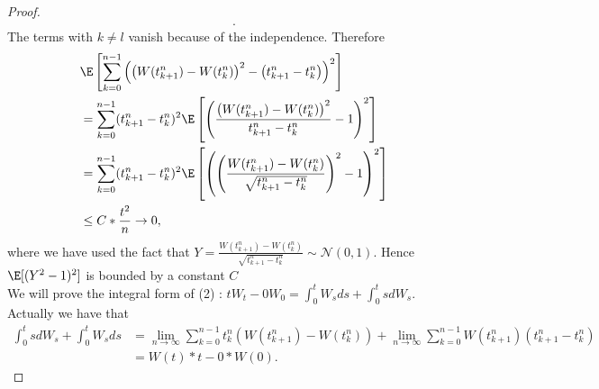 \begin{proof}
\begin{align*}
  .\end{align*}
  The terms with $k\neq l$ vanish because of the independence. Therefore
  \begin{align*}
    &\E \left[ \sum_{k=0}^{n-1}\left( \left( W(t_{k+1}^{n} ) - W(t_k^{n})\right)^2 - \left( t_{k+1}^{n} - t_k^{n}   \right)   \right)^2   \right] \\ 
    &= \sum_{k=0}^{n-1}(t_{k+1}^{n} - t_k^{n}  )^2 \E \left[ \left( \frac{\left( W(t_{k+1}^{n} ) - W(t_k^{n} ) \right)^2 }{t_{k+1}^{n} - t_{k}^{n}  } - 1 \right)^2  \right]  \\
    &= \sum_{k=0}^{n-1}(t_{k+1}^{n} - t_k^{n}  )^2 \E \left[ \left( \left(\frac{ W(t_{k+1}^{n} ) - W(t_k^{n} ) }{\sqrt{t_{k+1}^{n} - t_{k}^{n}}  } \right)^2 - 1 \right)^2  \right]  \\
    &\le C*\frac{t^2}{n}\to  0
  ,\end{align*}
  where we have used the fact that $Y = \frac{ W(t_{k+1}^{n} ) - W(t_k^{n} ) }{\sqrt{t_{k+1}^{n} - t_{k}^{n}}  } \sim \mathcal{N}(0,1)$. Hence $\E[(Y^2 - 1)^2]$ is 
  bounded by a constant $C$\\[1ex]
  We will prove the integral form of (2) : $tW_t - 0 W_0 =  \int_0^{t} W_s ds + \int_0^{t} s dW_s  $. Actually we have 
  that
  \begin{align*}
    \int_0^{t} s dW_s  + \int_0^{t} W_s ds &= \lim_{n\to \infty}   \sum_{k=0}^{n-1} t_k^{n}\left( W(t_{k+1}^{n}) -W(t_k^{n} ) \right) + \lim_{n\to \infty}\sum_{k=0}^{n-1} W(t_{k+1}^{n} ) (t_{k+1}^{n} - t_k^{n}  )\\
                                           &= W(t)*t - 0*W(0)
  .\end{align*}
  

\end{proof}
